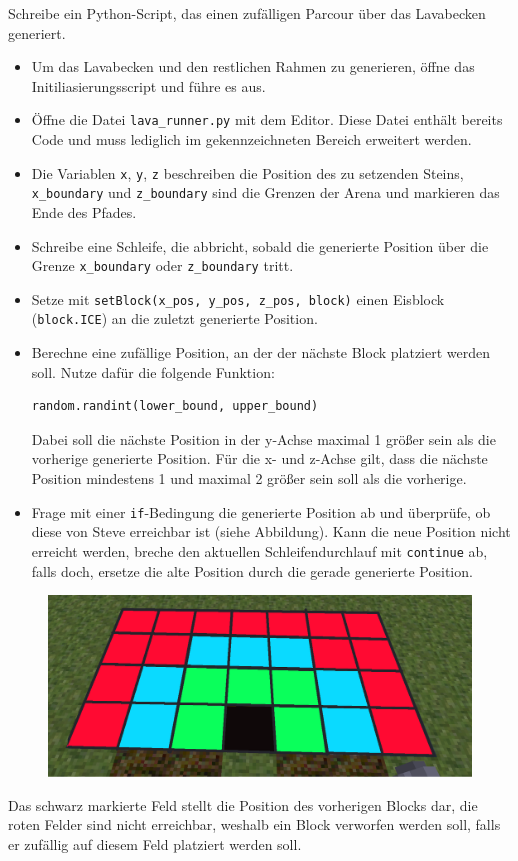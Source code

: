 \large Schreibe ein Python-Script, das einen zufälligen Parcour über das Lavabecken generiert.
\begin{itemize}
	\item Um das Lavabecken und den restlichen Rahmen zu generieren, öffne das Initiliasierungsscript und führe es aus.
	
	\item Öffne die Datei \texttt{lava\_runner.py} mit dem Editor. Diese Datei enthält bereits Code und muss lediglich im gekennzeichneten Bereich erweitert werden.
	
	\item Die Variablen \texttt{x}, \texttt{y}, \texttt{z} beschreiben die Position des zu setzenden Steins, \texttt{x\_boundary} und \texttt{z\_boundary} sind die Grenzen der Arena und markieren das Ende des Pfades.
	
	\item Schreibe eine Schleife, die abbricht, sobald die generierte Position über die Grenze \texttt{x\_boundary} oder \texttt{z\_boundary} tritt.

	\item Setze mit \texttt{setBlock(x\_pos, y\_pos, z\_pos, block)}  einen Eisblock (\texttt{block.ICE}) an die zuletzt generierte Position.

	\item Berechne eine zufällige Position, an der der nächste Block platziert werden soll. Nutze dafür die folgende Funktion:
		\begin{lstlisting}[language=Python]
random.randint(lower_bound, upper_bound)
		\end{lstlisting}
	Dabei soll die nächste Position in der y-Achse maximal 1 größer sein als die vorherige generierte Position. Für die x- und z-Achse gilt, dass die nächste Position mindestens 1 und maximal 2 größer sein soll als die vorherige.
		
	\item Frage mit einer \texttt{if}-Bedingung die generierte Position ab und überprüfe, ob diese von Steve erreichbar ist (siehe Abbildung). Kann die neue Position nicht erreicht werden, breche den aktuellen Schleifendurchlauf mit \texttt{continue} ab, falls doch, ersetze die alte Position durch die gerade generierte Position.
\end{itemize}
\begin{figure}
\centering
\includegraphics[scale=0.25]{src/lava_runner/res/1layer.png}
\end{figure}
	Das schwarz markierte Feld stellt die Position des vorherigen Blocks dar, die roten Felder sind nicht erreichbar, weshalb ein Block verworfen werden soll, falls er zufällig auf diesem Feld platziert werden soll.